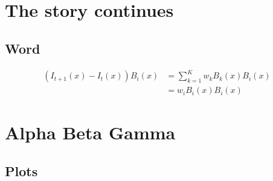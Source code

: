 \documentclass[]{ReportFormat}
\author{Krishna Toshniwal}
\date{\today}
\begin{document}
\thispagestyle{initial}
\maketitle
\pagestyle{other}



\setcounter{section}{-1}
\renewcommand\thesubsection{\thesection.\alph{subsection}}
\section{The story continues}

\subsection{Word}
\begin{align*}
(I_{t+1}(x)-I_t(x))B_i(x)&= \sum_{k=1}^K w_k B_k(x)  B_i(x)\\
&=w_i B_i(x)B_i(x)
\end{align*}

\renewcommand\thesubsection{\thesection.\arabic{subsection}}
\section{Alpha Beta Gamma}
\subsection{Plots}
\end{document}

